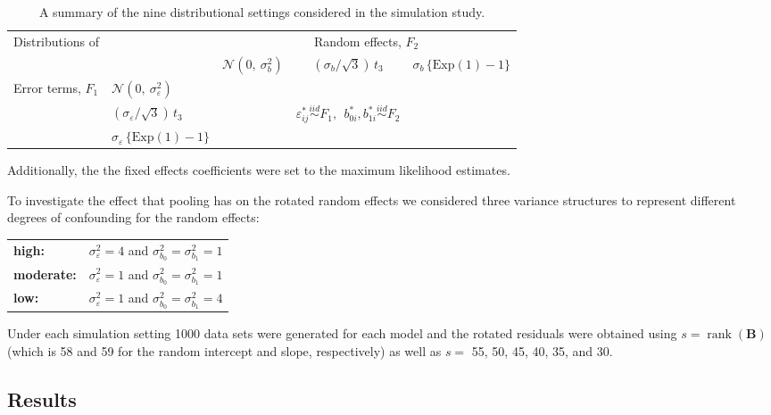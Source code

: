 \documentclass[12pt]{article} %
\DeclareMathOperator{\rank}{rank}
\begin{document}
\begin{table}[htdp]
\centering
\caption{\label{tab:simdsns} A summary of the nine distributional settings considered in the simulation study.}
\begin{tabular}{llccc}\hline
Distributions of & & \multicolumn{3}{c}{Random effects, $F_2$} \\ \cline{3-5}
           & & $\mathcal{N}(0, \ \sigma^2_{b})$ & $(\sigma_{b} / \sqrt{3})\, t_3$ & $\sigma_{b} \, \{ \text{Exp}(1) - 1 \}$ \\ \hline
Error terms, $F_1$  & $\mathcal{N}(0, \ \sigma^2_{\varepsilon})$       & &&\\
             & $(\sigma_{\varepsilon} / \sqrt{3})\, t_3$  &  & $\varepsilon_{ij}^* \overset{iid}{\sim} F_1, \ \ b_{0i}^*, b_{1i}^* \overset{iid}{\sim} F_2$ &  \\
             & $\sigma_{\varepsilon} \, \{ \text{Exp}(1) - 1 \}$       & && \\ 
\hline
\end{tabular} 
\end{table}

Additionally, the the fixed effects coefficients were set to the maximum likelihood estimates.

To investigate the effect that pooling has on the rotated random effects we considered  three variance structures to represent different degrees of confounding for the random effects:\\
%
\begin{tabular}{ll}
\textbf{high:} & $\sigma^2_\varepsilon = 4$ and  $\sigma^2_{b_0} = \sigma^2_{b_1} = 1$ \\
\textbf{moderate:} & $\sigma^2_\varepsilon = 1$ and  $\sigma^2_{b_0} = \sigma^2_{b_1} = 1$ \\
\textbf{low:} & $\sigma^2_\varepsilon = 1$ and  $\sigma^2_{b_0} = \sigma^2_{b_1} = 4$ \\
\end{tabular}
%

Under each simulation setting 1000 data sets were generated for each model and the rotated residuals were obtained using $s = \rank(\bm{B})$ (which is 58 and 59 for the random intercept and slope, respectively) as well as $s =$ 55, 50, 45, 40, 35, and 30.


\subsection{Results}\label{sec:sim-results}
\end{document}
